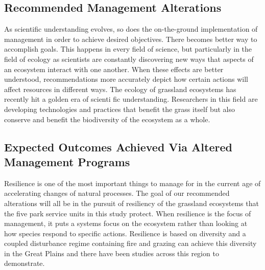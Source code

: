\subsection*{Recommended Management Alterations}
As scientific understanding evolves, so does the on-the-ground implementation of management in order to achieve desired objectives. There becomes better way to accomplish goals. This happens in every field of science, but particularly in the field of ecology as scientists are constantly discovering new ways that aspects of an ecosystem interact with one another. When these effects are better understood, recommendations more accurately depict how certain actions will affect resources in different ways. The ecology of grassland ecosystems has recently hit a golden era of scienti fic understanding. Researchers in this field are developing technologies and practices that benefit the grass itself but also conserve and benefit the biodiversity of the ecosystem as a whole.
\subsection*{Expected Outcomes Achieved Via Altered Management Programs}
Resilience is one of the most important things to manage for in the current age of accelerating changes of natural processes. The goal of our recommended alterations will all be in the pursuit of resiliency of the grassland ecosystems that the five park service units in this study protect. When resilience is the focus of management, it puts a systems focus on the ecosystem rather than looking at how species respond to specific actions. Resilience is based on diversity and a coupled disturbance regime containing fire and grazing can achieve this diversity in the Great Plains and there have been studies across this region to demonstrate.  